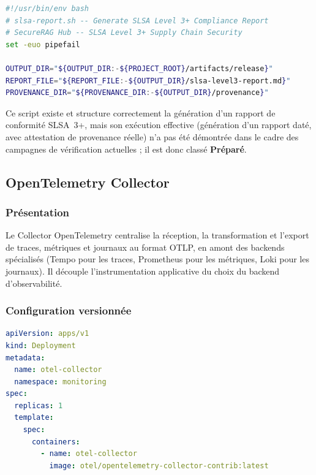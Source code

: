 \begin{lstlisting}[language=bash, caption={Extrait réel du script de génération de rapport SLSA (\texttt{scripts/supply-chain/slsa-report.sh})}, label={lst:slsa_report_reel}]
#!/usr/bin/env bash
# slsa-report.sh -- Generate SLSA Level 3+ Compliance Report
# SecureRAG Hub -- SLSA Level 3+ Supply Chain Security
set -euo pipefail

OUTPUT_DIR="${OUTPUT_DIR:-${PROJECT_ROOT}/artifacts/release}"
REPORT_FILE="${REPORT_FILE:-${OUTPUT_DIR}/slsa-level3-report.md}"
PROVENANCE_DIR="${PROVENANCE_DIR:-${OUTPUT_DIR}/provenance}"
\end{lstlisting}

Ce script existe et structure correctement la génération d'un rapport de conformité SLSA~3+, mais son exécution effective (génération d'un rapport daté, avec attestation de provenance réelle) n'a pas été démontrée dans le cadre des campagnes de vérification actuelles ; il est donc classé \textbf{Préparé}.

\subsection{OpenTelemetry Collector}
\label{subsec:otel_v2}

\subsubsection{Présentation}
Le Collector OpenTelemetry centralise la réception, la transformation et l'export de traces, métriques et journaux au format OTLP, en amont des backends spécialisés (Tempo pour les traces, Prometheus pour les métriques, Loki pour les journaux). Il découple l'instrumentation applicative du choix du backend d'observabilité.

\subsubsection{Configuration versionnée}
\begin{lstlisting}[language=yaml, caption={Extrait réel du déploiement du Collector OpenTelemetry (\texttt{infra/k8s/otel/deployment.yaml})}, label={lst:otel_deployment_reel}]
apiVersion: apps/v1
kind: Deployment
metadata:
  name: otel-collector
  namespace: monitoring
spec:
  replicas: 1
  template:
    spec:
      containers:
        - name: otel-collector
          image: otel/opentelemetry-collector-contrib:latest
\end{lstlisting}

